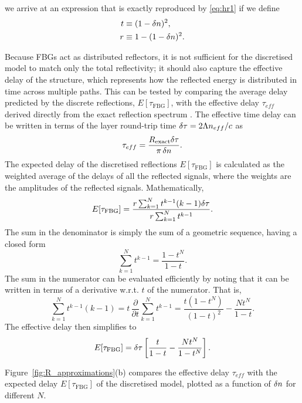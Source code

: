 %
we arrive at an expression that is exactly reproduced by \eqref{eq:hr1} if we define
%
\begin{align}
\label{eq:tr}
t &\equiv (1-\delta n)^2, \\
r &\equiv 1-(1-\delta n)^2.
\end{align}
%
\par
%
Because FBGs act as distributed reflectors, it is not sufficient for the discretised model to match only the total reflectivity; it should also capture the effective delay of the structure, which represents how the reflected energy is distributed in time across multiple paths.
This can be tested by comparing the average delay predicted by the discrete reflections, $E[\tau_\text{FBG}]$, with the effective delay $\tau_{eff}$ derived directly from the exact reflection spectrum \cite{barmenkov2006effective}.
The effective time delay can be written in terms of the layer round-trip time $\delta \tau = 2 \Lambda n_{eff}/c$ as
%
\begin{equation}
    \label{eq:tau_exact}
    \tau_{eff} = \frac{R_\text{exact} \delta \tau}{\pi \, \delta n}.
\end{equation}
%
The expected delay of the discretised reflections $E[\tau_\text{FBG}]$ is calculated as the weighted average of the delays of all the reflected signals, where the weights are the amplitudes of the reflected signals. 
Mathematically,
%
\begin{equation*}
    E[\tau_\text{FBG}] = \frac{r \sum_{k=1}^{N} t^{k-1} (k-1)\delta \tau}{r \sum_{k=1}^{N} t^{k-1}}.
\end{equation*}
%
The sum in the denominator is simply the sum of a geometric sequence, having a closed form
%
\begin{equation*}
    \sum_{k=1}^{N} t^{k-1} = \frac{1-t^N}{1-t}.
\end{equation*}
%
The sum in the numerator can be evaluated efficiently by noting that it can be written in terms of a derivative w.r.t. $t$ of the numerator. That is,
%
\begin{equation*}
    \sum_{k=1}^{N} t^{k-1} (k-1) = t \, \frac{\partial}{\partial t} \sum_{k=1}^{N} t^{k-1} = \frac{t(1-t^N)}{(1-t)^2} - \frac{N t^N}{1-t}.
\end{equation*}
%
The effective delay then simplifies to
%
\begin{equation}
    \label{eq:tau_approx}
    E[\tau_\text{FBG}] = \delta \tau\left[ \frac{t}{1-t} - \frac{N t^N}{1-t^N} \right].
\end{equation}
%
\par
%
Figure~\ref{fig:R_approximations}(b) compares the effective delay $\tau_{eff}$ with the expected delay $E[\tau_\text{FBG}]$ of the discretised model, plotted as a function of $\delta n$ for different $N$.
